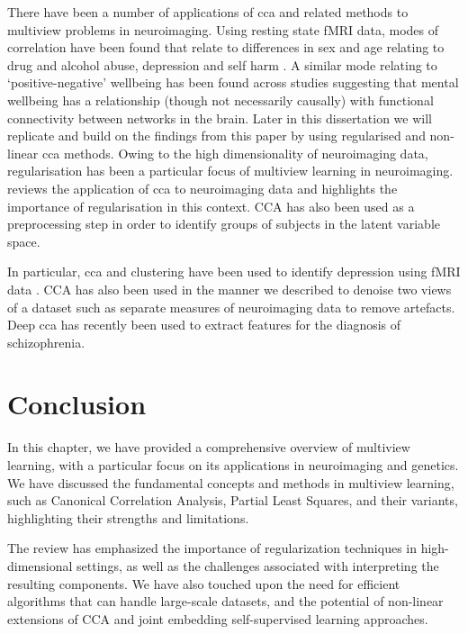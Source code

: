 There have been a number of applications of \acrshort{cca} and related methods to multiview problems in neuroimaging.
Using resting state fMRI data, modes of correlation have been found that relate to differences in sex and age relating to drug and alcohol abuse, depression and self harm \citep{mihalik2019brain}.
A similar mode relating to `positive-negative' wellbeing has been found across studies \citep{smith2015positive} suggesting that mental wellbeing has a relationship (though not necessarily causally) with functional connectivity between networks in the brain.
Later in this dissertation we will replicate and build on the findings from this paper by using regularised and non-linear \acrshort{cca} methods.
Owing to the high dimensionality of neuroimaging data, regularisation has been a particular focus of multiview learning in neuroimaging. \citet{mihalik2022canonical} reviews the application of \acrshort{cca} to neuroimaging data and highlights the importance of regularisation in this context. \citet{bilenko2016pyrcca} 
CCA has also been used as a preprocessing step in order to identify groups of subjects in the latent variable space.

In particular, \acrshort{cca} and clustering have been used to identify depression using fMRI data \citep{dinga2019evaluating,drysdale2017resting}.
CCA has also been used in the manner we described to denoise two \gls{views} of a dataset such as separate measures of neuroimaging data \citep{zhuang2020technical} to remove artefacts.
Deep \acrshort{cca} has recently been used to extract features for the diagnosis of schizophrenia\citep{qi2016deep}.

\section{Conclusion}

In this chapter, we have provided a comprehensive overview of multiview learning, with a particular focus on its applications in neuroimaging and genetics. We have discussed the fundamental concepts and methods in multiview learning, such as Canonical Correlation Analysis, Partial Least Squares, and their variants, highlighting their strengths and limitations.

The review has emphasized the importance of regularization techniques in high-dimensional settings, as well as the challenges associated with interpreting the resulting components. We have also touched upon the need for efficient algorithms that can handle large-scale datasets, and the potential of non-linear extensions of CCA and joint embedding self-supervised learning approaches.

